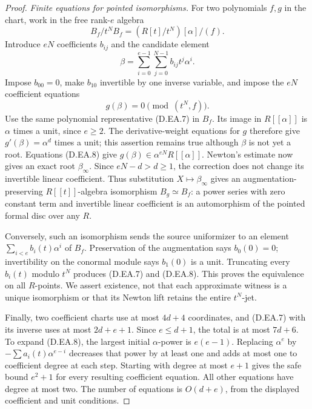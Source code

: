 \begin{proof}
\emph{Finite equations for pointed isomorphisms.}
For two polynomials $f,g$ in the chart, work in the free rank-$e$
algebra
\[
 B_f/t^N B_f=(R[t]/t^N)[\alpha]/(f).
\]
Introduce $eN$ coefficients $b_{ij}$ and the candidate element
\[
 \beta=\sum_{i=0}^{e-1}\sum_{j=0}^{N-1}b_{ij}t^j\alpha^i.
                                                               \tag{D.EA.7}
\]
Impose $b_{00}=0$, make $b_{10}$ invertible by one inverse variable,
and impose the $eN$ coefficient equations
\[
                         g(\beta)=0\pmod{(t^N,f)}.     \tag{D.EA.8}
\]
Use the same polynomial representative (D.EA.7) in $B_f$. Its image
in $R[[\alpha]]$ is $\alpha$ times a unit, since $e\ge2$.
The derivative-weight equations for $g$ therefore give
$g'(\beta)=\alpha^d$ times a unit; this assertion remains true
although $\beta$ is not yet a root. Equations (D.EA.8) give
$g(\beta)\in\alpha^{eN}R[[\alpha]]$. Newton's estimate now gives
an exact root $\beta_\infty$. Since $eN-d>d\ge1$, the correction
does not change its invertible linear coefficient. Thus substitution
$X\mapsto\beta_\infty$ gives an augmentation-preserving
$R[[t]]$-algebra isomorphism $B_g\simeq B_f$: a power series with
zero constant term and invertible linear coefficient is an
automorphism of the pointed formal disc over any $R$.

Conversely, such an isomorphism sends the source uniformizer to an
element $\sum_{i<e}b_i(t)\alpha^i$ of $B_f$. Preservation of the
augmentation says $b_0(0)=0$; invertibility on the conormal module
says $b_1(0)$ is a unit. Truncating every $b_i(t)$ modulo $t^N$
produces (D.EA.7) and (D.EA.8). This proves the equivalence on all
$R$-points. We assert existence, not that each approximate witness
is a unique isomorphism or that its Newton lift retains the entire
$t^N$-jet.

Finally, two coefficient charts use at most $4d+4$ coordinates,
and (D.EA.7) with its inverse uses at most $2d+e+1$. Since
$e\le d+1$, the total is at most $7d+6$. To expand (D.EA.8), the
largest initial $\alpha$-power is $e(e-1)$. Replacing
$\alpha^e$ by $-\sum a_i(t)\alpha^{e-i}$ decreases that power by
at least one and adds at most one to coefficient degree at each
step. Starting with degree at most $e+1$ gives the safe bound
$e^2+1$ for every resulting coefficient equation. All other
equations have degree at most two. The number of equations is
$O(d+e)$, from the displayed coefficient and unit conditions.
\end{proof}

